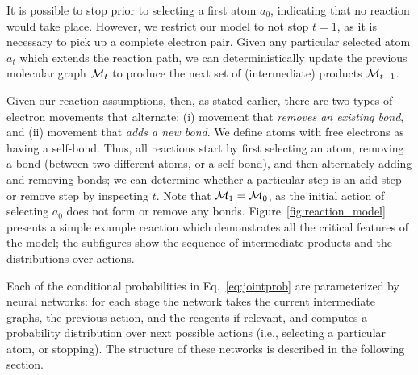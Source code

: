 It is possible to stop prior to selecting a first atom $a_0$, indicating that no reaction would take place.
However, we restrict our model to not stop $t\!=\!1$, as it is necessary to pick up a complete electron pair. 
Given any particular selected atom $a_t$ which extends the reaction path, we can deterministically update the previous molecular graph ${\mathcal{M}}_{t}$ to produce the next set of (intermediate) products ${\mathcal{M}}_{t+1}$.

Given our reaction assumptions, then, as stated earlier, there are two types of electron movements that alternate: 
(i) movement that \emph{removes an existing bond}, and 
(ii) movement that \emph{adds a new bond}. 
We define atoms with free electrons as having a self-bond.
Thus, all reactions start by first selecting an atom, removing a bond (between two different atoms, or a self-bond), and then alternately adding and removing bonds;
we can determine whether a particular step is an add step or remove step by inspecting $t$.
Note that ${\mathcal{M}}_1 = {\mathcal{M}}_0$, as the initial action of selecting $a_0$ does not form or remove any bonds.
Figure~\ref{fig:reaction_model} presents a simple example reaction which demonstrates all the critical features of the model;
the subfigures show the sequence of intermediate products and the distributions over actions.


Each of the conditional probabilities in Eq.~\eqref{eq:jointprob} are parameterized by neural networks:
for each stage the network takes the current intermediate graphs, 
the previous action, and the reagents if relevant, 
and computes a probability distribution over next possible actions (i.e., selecting a particular atom, or stopping).
The structure of these networks is described in the following section.

